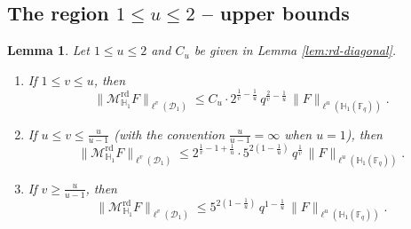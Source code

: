 \documentclass[11pt]{article}
\newtheorem{lemma}[theorem]{Lemma}
\newcommand{\1}{\mathbf 1}
\begin{document}
\subsection{The region $1\le u\le 2$ -- upper bounds}
\begin{lemma}\label{lem:rd-upper-u-le-2}
Let $1\le u\le 2$ and $C_u$ be given in Lemma \ref{lem:rd-diagonal}.
\begin{enumerate}[label=\emph{(\alph*)},itemsep=0.3em]
\item If $1\le v\le u$, then
\[
\|\mathcal{M}^{\mathrm{rd}}_{\mathbb H_1}F\|_{\ell^v(\mathcal D_1)}
\leq C_u \cdot 2^{\frac{1}{v}-\frac{1}{u}} \,
q^{\frac{2}{v}-\frac{1}{u}}\,
\|F\|_{\ell^u(\mathbb H_1(\mathbb F_q))}.
\]
\item If $u\le v\le \frac{u}{u-1}$ (with the convention $\frac{u}{u-1}=\infty$ when $u=1$), then
\[
\|\mathcal{M}^{\mathrm{rd}}_{\mathbb H_1}F\|_{\ell^v(\mathcal D_1)}
\leq 2^{\frac{1}{v}-1+\frac{1}{u}} \cdot 5^{2(1-\frac{1}{u})} \, 
q^{\frac{1}{v}}\,
\|F\|_{\ell^u(\mathbb H_1(\mathbb F_q))}.
\]
\item If $v\ge \frac{u}{u-1}$, then
\[
\|\mathcal{M}^{\mathrm{rd}}_{\mathbb H_1}F\|_{\ell^v(\mathcal D_1)}
\leq 5^{2(1-\frac{1}{u})} \,
q^{1-\frac{1}{u}}\,
\|F\|_{\ell^u(\mathbb H_1(\mathbb F_q))}.
\]
\end{enumerate}
\end{lemma}
\end{document}
